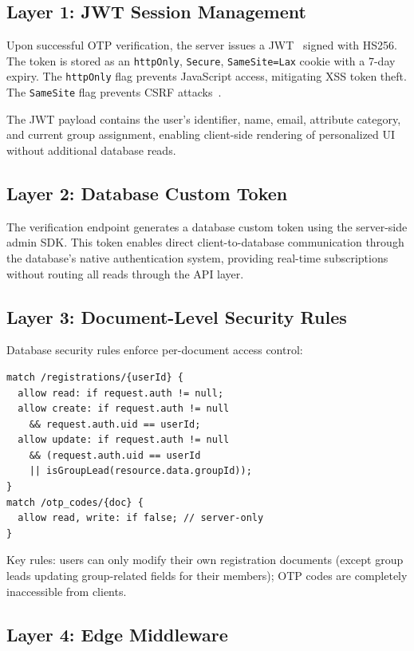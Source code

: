 \documentclass[11pt,a4paper]{article}
\theoremstyle{plain}
\theoremstyle{definition}
\theoremstyle{remark}
\begin{document}
\subsection{Layer 1: JWT Session Management}

Upon successful OTP verification, the server issues a JWT~\cite{jones2015} signed with HS256. The token is stored as an \texttt{httpOnly}, \texttt{Secure}, \texttt{SameSite=Lax} cookie with a 7-day expiry. The \texttt{httpOnly} flag prevents JavaScript access, mitigating XSS token theft. The \texttt{SameSite} flag prevents CSRF attacks~\cite{barth2008}.

The JWT payload contains the user's identifier, name, email, attribute category, and current group assignment, enabling client-side rendering of personalized UI without additional database reads.

\subsection{Layer 2: Database Custom Token}

The verification endpoint generates a database custom token using the server-side admin SDK. This token enables direct client-to-database communication through the database's native authentication system, providing real-time subscriptions without routing all reads through the API layer.

\subsection{Layer 3: Document-Level Security Rules}

Database security rules enforce per-document access control:
\begin{lstlisting}[language={}, caption={Document-level security rules (excerpt)}, label={lst:rules}]
match /registrations/{userId} {
  allow read: if request.auth != null;
  allow create: if request.auth != null
    && request.auth.uid == userId;
  allow update: if request.auth != null
    && (request.auth.uid == userId
    || isGroupLead(resource.data.groupId));
}
match /otp_codes/{doc} {
  allow read, write: if false; // server-only
}
\end{lstlisting}

Key rules: users can only modify their own registration documents (except group leads updating group-related fields for their members); OTP codes are completely inaccessible from clients.

\subsection{Layer 4: Edge Middleware}
\end{document}
